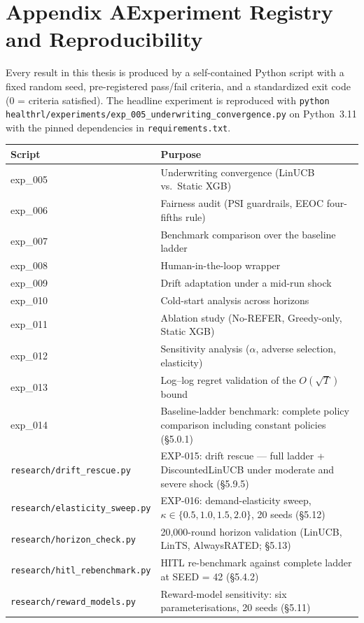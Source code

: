 
\section*{Appendix A\quad Experiment Registry and Reproducibility}

Every result in this thesis is produced by a self-contained Python script with a
fixed random seed, pre-registered pass/fail criteria, and a standardized exit code
(0 = criteria satisfied). The headline experiment is reproduced with
\texttt{python healthrl/experiments/exp\_005\_underwriting\_convergence.py} on
Python~3.11 with the pinned dependencies in \texttt{requirements.txt}.

\begin{center}
\renewcommand{\arraystretch}{1.25}
{\small
\begin{tabular}{>{\ttfamily}l p{9cm}}
\toprule
\textnormal{\textbf{Script}} & \textbf{Purpose} \\
\midrule
exp\_005 & Underwriting convergence (LinUCB vs.\ Static XGB) \\
exp\_006 & Fairness audit (PSI guardrails, EEOC four-fifths rule) \\
exp\_007 & Benchmark comparison over the baseline ladder \\
exp\_008 & Human-in-the-loop wrapper \\
exp\_009 & Drift adaptation under a mid-run shock \\
exp\_010 & Cold-start analysis across horizons \\
exp\_011 & Ablation study (No-REFER, Greedy-only, Static XGB) \\
exp\_012 & Sensitivity analysis ($\alpha$, adverse selection, elasticity) \\
exp\_013 & Log--log regret validation of the $O(\sqrt{T})$ bound \\
exp\_014 & Baseline-ladder benchmark: complete policy comparison including constant policies (§5.0.1) \\
\texttt{research/drift\_rescue.py} & EXP-015: drift rescue --- full ladder + DiscountedLinUCB under moderate and severe shock (§5.9.5) \\
\texttt{research/elasticity\_sweep.py} & EXP-016: demand-elasticity sweep, $\kappa \in \{0.5, 1.0, 1.5, 2.0\}$, 20 seeds (§5.12) \\
\texttt{research/horizon\_check.py} & 20{,}000-round horizon validation (LinUCB, LinTS, AlwaysRATED; §5.13) \\
\texttt{research/hitl\_rebenchmark.py} & HITL re-benchmark against complete ladder at SEED = 42 (§5.4.2) \\
\texttt{research/reward\_models.py} & Reward-model sensitivity: six parameterisations, 20 seeds (§5.11) \\
\bottomrule
\end{tabular}
}
\end{center}


